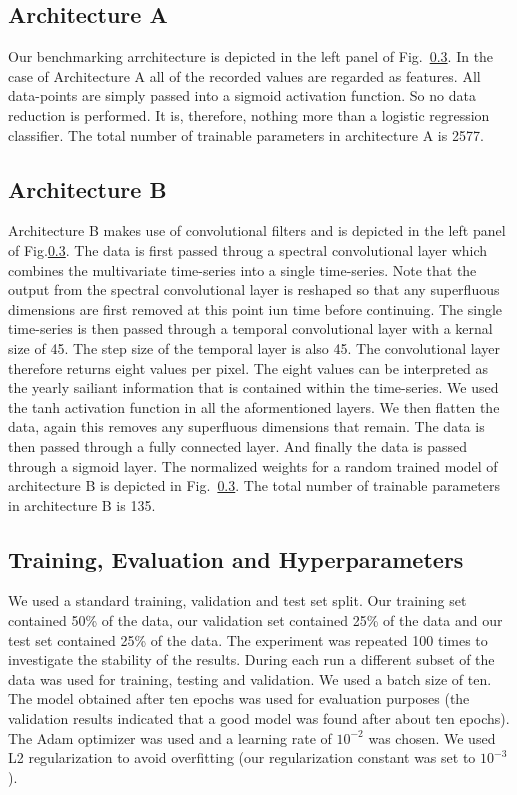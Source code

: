 \documentclass{article}
\begin{document}
\subsection{Architecture A}
Our benchmarking arrchitecture is depicted in the left panel of Fig.~\ref{}. In the case of Architecture A all of the recorded values are regarded as features. All data-points are simply passed into a sigmoid activation function. So no data reduction is performed. It is, therefore,  nothing more than a logistic regression classifier.
The total number of trainable parameters in architecture A is 2577.

\subsection{Architecture B}
Architecture B makes use of convolutional filters and is depicted in the left panel of Fig.\ref{}. The data is first passed throug a spectral convolutional layer which combines the multivariate time-series into a single time-series. Note that the output from the spectral convolutional layer is reshaped so that any superfluous dimensions are first removed at this point iun time before continuing. The single time-series is then passed through a temporal convolutional layer with a kernal size of 45. The step size of the temporal layer is also 45. The convolutional layer therefore returns eight values per pixel. The eight values can be interpreted as the yearly sailiant information that is contained within the time-series. We used the tanh activation function in all the aformentioned layers. We then flatten the data, again this removes any superfluous dimensions that remain. The data is then passed through a fully connected layer. And finally the data is passed through a sigmoid layer. The normalized weights for a random trained model of architecture B is depicted in Fig.~\ref{}. The total number of trainable parameters in architecture B is 135.
     

\subsection{Training, Evaluation and Hyperparameters}
We used a standard training, validation and test set split. Our training set contained 50\% of the data, our validation set contained 25\% of the data and our test set contained 25\% of the data. The experiment was repeated 100 times to investigate the stability of the results. During each run a different subset of the data was used for training, testing and validation. We used a batch size of ten. The model obtained after ten epochs was used for evaluation purposes (the validation results indicated that a good model was found after about ten epochs). The Adam optimizer was used and a learning rate of $10^{-2}$ was chosen. We used L2 regularization to avoid overfitting (our regularization constant was set to $10^{-3}$).    
\end{document}
